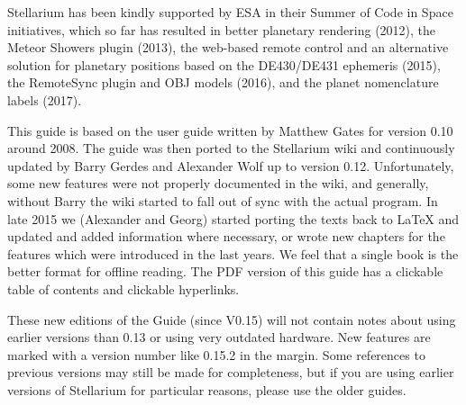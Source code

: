 Stellarium has been kindly supported by ESA in their Summer of Code in
Space initiatives, which so far has resulted in better planetary rendering
(2012), the Meteor Showers plugin (2013), the web-based remote
control and an alternative solution for planetary positions based on
the DE430/DE431 ephemeris (2015), the RemoteSync plugin and OBJ models (2016), 
and the planet nomenclature labels (2017).


This guide is based on the user guide written by Matthew Gates for
version 0.10 around 2008. The guide was then ported to the Stellarium
wiki and continuously updated by Barry Gerdes and Alexander Wolf up to version 0.12. 
Unfortunately, some new features were not properly documented in the wiki, and generally, 
without Barry the wiki started to fall out of sync with
the actual program.  In late 2015 we (Alexander and Georg) started porting the texts
back to \LaTeX{} and updated and added information where necessary, 
or wrote new chapters for the features which were introduced in the last years. 
We feel that a single book is the better format for offline
reading. The PDF version of this guide has a clickable table of
contents and clickable hyperlinks.

These new editions of the Guide (since V0.15) will not contain notes about using
earlier versions than 0.13 or using very outdated hardware. 
New features are marked with a version number like 0.15.2 in the margin. 
Some references to previous versions may still be made for completeness, 
but if you are using earlier versions of Stellarium 
for particular reasons, please use the older guides.

